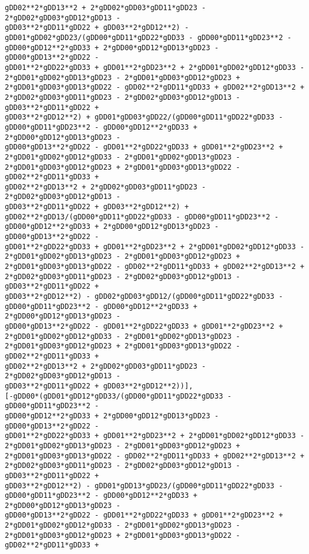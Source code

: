 \documentclass[landscape,letterpaper,10pt,english]{article}
\begin{document}
\begin{Verbatim}[commandchars=\\\{\}]
gDD02**2*gDD13**2 + 2*gDD02*gDD03*gDD11*gDD23 - 2*gDD02*gDD03*gDD12*gDD13 -
gDD03**2*gDD11*gDD22 + gDD03**2*gDD12**2) -
gDD01*gDD02*gDD23/(gDD00*gDD11*gDD22*gDD33 - gDD00*gDD11*gDD23**2 -
gDD00*gDD12**2*gDD33 + 2*gDD00*gDD12*gDD13*gDD23 - gDD00*gDD13**2*gDD22 -
gDD01**2*gDD22*gDD33 + gDD01**2*gDD23**2 + 2*gDD01*gDD02*gDD12*gDD33 -
2*gDD01*gDD02*gDD13*gDD23 - 2*gDD01*gDD03*gDD12*gDD23 +
2*gDD01*gDD03*gDD13*gDD22 - gDD02**2*gDD11*gDD33 + gDD02**2*gDD13**2 +
2*gDD02*gDD03*gDD11*gDD23 - 2*gDD02*gDD03*gDD12*gDD13 - gDD03**2*gDD11*gDD22 +
gDD03**2*gDD12**2) + gDD01*gDD03*gDD22/(gDD00*gDD11*gDD22*gDD33 -
gDD00*gDD11*gDD23**2 - gDD00*gDD12**2*gDD33 + 2*gDD00*gDD12*gDD13*gDD23 -
gDD00*gDD13**2*gDD22 - gDD01**2*gDD22*gDD33 + gDD01**2*gDD23**2 +
2*gDD01*gDD02*gDD12*gDD33 - 2*gDD01*gDD02*gDD13*gDD23 -
2*gDD01*gDD03*gDD12*gDD23 + 2*gDD01*gDD03*gDD13*gDD22 - gDD02**2*gDD11*gDD33 +
gDD02**2*gDD13**2 + 2*gDD02*gDD03*gDD11*gDD23 - 2*gDD02*gDD03*gDD12*gDD13 -
gDD03**2*gDD11*gDD22 + gDD03**2*gDD12**2) +
gDD02**2*gDD13/(gDD00*gDD11*gDD22*gDD33 - gDD00*gDD11*gDD23**2 -
gDD00*gDD12**2*gDD33 + 2*gDD00*gDD12*gDD13*gDD23 - gDD00*gDD13**2*gDD22 -
gDD01**2*gDD22*gDD33 + gDD01**2*gDD23**2 + 2*gDD01*gDD02*gDD12*gDD33 -
2*gDD01*gDD02*gDD13*gDD23 - 2*gDD01*gDD03*gDD12*gDD23 +
2*gDD01*gDD03*gDD13*gDD22 - gDD02**2*gDD11*gDD33 + gDD02**2*gDD13**2 +
2*gDD02*gDD03*gDD11*gDD23 - 2*gDD02*gDD03*gDD12*gDD13 - gDD03**2*gDD11*gDD22 +
gDD03**2*gDD12**2) - gDD02*gDD03*gDD12/(gDD00*gDD11*gDD22*gDD33 -
gDD00*gDD11*gDD23**2 - gDD00*gDD12**2*gDD33 + 2*gDD00*gDD12*gDD13*gDD23 -
gDD00*gDD13**2*gDD22 - gDD01**2*gDD22*gDD33 + gDD01**2*gDD23**2 +
2*gDD01*gDD02*gDD12*gDD33 - 2*gDD01*gDD02*gDD13*gDD23 -
2*gDD01*gDD03*gDD12*gDD23 + 2*gDD01*gDD03*gDD13*gDD22 - gDD02**2*gDD11*gDD33 +
gDD02**2*gDD13**2 + 2*gDD02*gDD03*gDD11*gDD23 - 2*gDD02*gDD03*gDD12*gDD13 -
gDD03**2*gDD11*gDD22 + gDD03**2*gDD12**2))],
[-gDD00*(gDD01*gDD12*gDD33/(gDD00*gDD11*gDD22*gDD33 - gDD00*gDD11*gDD23**2 -
gDD00*gDD12**2*gDD33 + 2*gDD00*gDD12*gDD13*gDD23 - gDD00*gDD13**2*gDD22 -
gDD01**2*gDD22*gDD33 + gDD01**2*gDD23**2 + 2*gDD01*gDD02*gDD12*gDD33 -
2*gDD01*gDD02*gDD13*gDD23 - 2*gDD01*gDD03*gDD12*gDD23 +
2*gDD01*gDD03*gDD13*gDD22 - gDD02**2*gDD11*gDD33 + gDD02**2*gDD13**2 +
2*gDD02*gDD03*gDD11*gDD23 - 2*gDD02*gDD03*gDD12*gDD13 - gDD03**2*gDD11*gDD22 +
gDD03**2*gDD12**2) - gDD01*gDD13*gDD23/(gDD00*gDD11*gDD22*gDD33 -
gDD00*gDD11*gDD23**2 - gDD00*gDD12**2*gDD33 + 2*gDD00*gDD12*gDD13*gDD23 -
gDD00*gDD13**2*gDD22 - gDD01**2*gDD22*gDD33 + gDD01**2*gDD23**2 +
2*gDD01*gDD02*gDD12*gDD33 - 2*gDD01*gDD02*gDD13*gDD23 -
2*gDD01*gDD03*gDD12*gDD23 + 2*gDD01*gDD03*gDD13*gDD22 - gDD02**2*gDD11*gDD33 +

\end{Verbatim}
\end{document}
